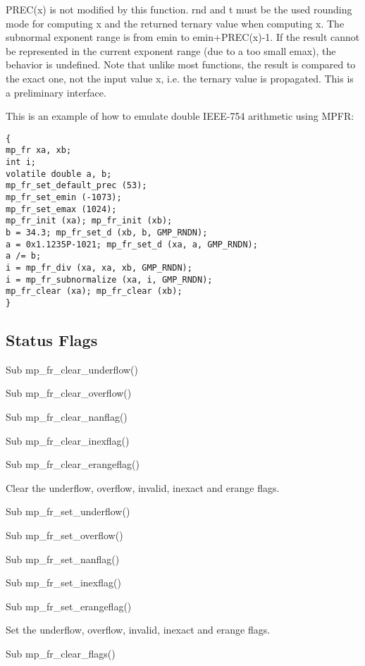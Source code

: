 \vspace{0.3cm}
PREC(x) is not modified by this function. rnd and t must be the used rounding mode for computing x and the returned ternary value when computing x. The subnormal exponent range is from emin to emin+PREC(x)-1. If the result cannot be represented in the current exponent range (due to a too small emax), the behavior is undefined. Note that unlike most functions, the result is compared to the exact one, not the input value x, i.e. the ternary value is propagated. This is a preliminary interface. 

\vspace{0.3cm}
This is an example of how to emulate double IEEE-754 arithmetic using MPFR: 

\begin{verbatim}
{
mp_fr xa, xb;
int i;
volatile double a, b;
mp_fr_set_default_prec (53);
mp_fr_set_emin (-1073);
mp_fr_set_emax (1024);
mp_fr_init (xa); mp_fr_init (xb);
b = 34.3; mp_fr_set_d (xb, b, GMP_RNDN);
a = 0x1.1235P-1021; mp_fr_set_d (xa, a, GMP_RNDN);
a /= b;
i = mp_fr_div (xa, xa, xb, GMP_RNDN);
i = mp_fr_subnormalize (xa, i, GMP_RNDN);
mp_fr_clear (xa); mp_fr_clear (xb);
} 
\end{verbatim}




\subsection{Status Flags}


Sub mp\_fr\_clear\_underflow() 

Sub mp\_fr\_clear\_overflow() 

Sub mp\_fr\_clear\_nanflag() 

Sub mp\_fr\_clear\_inexflag() 

Sub mp\_fr\_clear\_erangeflag() 

Clear the underflow, overflow, invalid, inexact and erange flags. 

\vspace{0.3cm}
Sub mp\_fr\_set\_underflow() 

Sub mp\_fr\_set\_overflow() 

Sub mp\_fr\_set\_nanflag() 

Sub mp\_fr\_set\_inexflag() 

Sub mp\_fr\_set\_erangeflag() 

Set the underflow, overflow, invalid, inexact and erange flags. 

\vspace{0.3cm}
Sub mp\_fr\_clear\_flags() 

